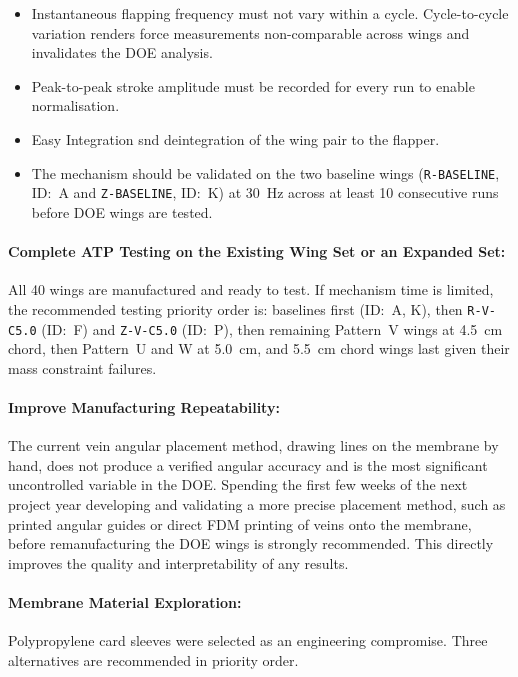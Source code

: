 \begin{itemize}
    \item Instantaneous flapping frequency must not vary within a cycle. Cycle-to-cycle variation renders force measurements non-comparable across wings and invalidates the DOE analysis.
    \item Peak-to-peak stroke amplitude must be recorded for every run to enable normalisation.
    \item Easy Integration snd deintegration of the wing pair to the flapper.
    \item The mechanism should be validated on the two baseline wings 
    (\texttt{R-BASELINE}, ID:~A and \texttt{Z-BASELINE}, ID:~K) at 30~Hz across at least 10 consecutive runs before DOE wings are tested.
\end{itemize}

\paragraph{Complete ATP Testing on the Existing Wing Set or an Expanded Set:}
All 40 wings are manufactured and ready to test. If mechanism time is limited, the recommended testing priority order is: baselines first (ID:~A, K), then \texttt{R-V-C5.0} (ID:~F) and \texttt{Z-V-C5.0} (ID:~P), then remaining Pattern~V wings at 4.5~cm chord, then Pattern~U and W at 5.0~cm, and 5.5~cm chord wings last given their mass constraint failures.

\paragraph{Improve Manufacturing Repeatability:}
The current vein angular placement method, drawing lines on the membrane by hand, does not produce a verified angular accuracy and is the most significant uncontrolled variable in the DOE. Spending the first few weeks of the next project year developing and validating a more precise placement method, such as printed angular guides or direct FDM printing of veins onto the membrane, before remanufacturing the DOE wings is strongly recommended. This directly improves the quality and interpretability of any results.

\paragraph{Membrane Material Exploration:}
Polypropylene card sleeves were selected as an engineering compromise. Three alternatives are recommended in priority order.

